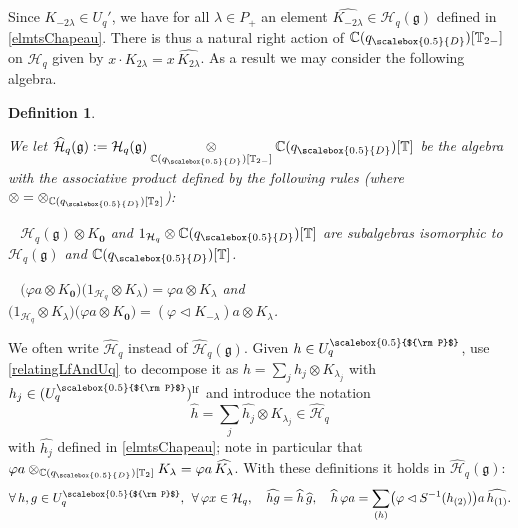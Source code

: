 \documentclass[11pt]{amsart}
\newtheorem{defi}[teo]{Definition}
\newcommand{\qD}{q_{\scalebox{0.5}{D}}}
\newcommand{\Pup}{{\scalebox{0.5}{${\rm P}$}}}
\begin{document}
\indent Since $K_{-2\lambda} \in U_q'$, we have for all $\lambda \in P_+$ an element $\widehat{K_{-2\lambda}} \in \mathcal{H}_q(\mathfrak{g})$ defined in \eqref{elmtsChapeau}. There is thus a natural right action of $\mathbb{C}(\qD)[\mathbb{T}_{2-}]$ on $\mathcal{H}_q$ given by $x \cdot K_{2\lambda} = x\,\widehat{K_{2\lambda}}$. As a result we may consider the following algebra.
\begin{defi}\label{defiHhatq} {\rm We let $\widehat{\mathcal{H}}_q(\mathfrak{g}) := \mathcal{H}_q(\mathfrak{g}) \underset{\mathbb{C}(\qD)[\mathbb{T}_{2-}]}{\otimes} \mathbb{C}(\qD)[\mathbb{T}]$ be the algebra with the associative product defined by the following rules (where $\otimes = \otimes_{\mathbb{C}(\qD)[\mathbb{T}_2]}$):
\smallskip

\indent \textbullet ~ $\mathcal{H}_q(\mathfrak{g}) \otimes K_{\boldsymbol{0}}$ and $1_{\mathcal{H}_q} \otimes \mathbb{C}(\qD)[\mathbb{T}]$ are subalgebras isomorphic to $\mathcal{H}_q(\mathfrak{g})$ and $\mathbb{C}(\qD)[\mathbb{T}]$.

\smallskip

\indent \textbullet ~ $\bigl( \varphi a \otimes K_{\boldsymbol{0}} \bigr) \bigl( 1_{\mathcal{H}_q} \otimes K_\lambda \bigr) = \varphi a \otimes K_\lambda$ and $\bigl( 1_{\mathcal{H}_q} \otimes K_\lambda \bigr) \bigl( \varphi a \otimes K_{\boldsymbol{0}} \bigr) = (\varphi \lhd K_{-\lambda})a \otimes K_\lambda$.}
\end{defi}

\noindent We often write $\widehat{\mathcal{H}}_q$ instead of $\widehat{\mathcal{H}}_q(\mathfrak{g})$. Given $h \in U_q^\Pup$, use \eqref{relatingLfAndUq} to decompose it as $h = \textstyle \sum_j h_j \otimes K_{\lambda_j}$ with $h_j \in(U_q^\Pup)^{\mathrm{lf}}$ and introduce the notation
\begin{equation}\label{elmtsChapeauHq}
\widehat{h} = \textstyle \sum_j  \widehat{h_j} \otimes K_{\lambda_j} \in \widehat{\mathcal{H}}_q
\end{equation}
with $\widehat{h_j}$ defined in \eqref{elmtsChapeau}; note in particular that $\varphi a \otimes_{\mathbb{C}(\qD)[\mathbb{T}_2]} K_\lambda = \varphi a \, \widehat{K_\lambda}$. With these definitions it holds in $\widehat{\mathcal{H}}_q(\mathfrak{g})$:
\begin{equation}\label{commutationHatHq}
\forall \, h,g \in U_q^\Pup, \:\: \forall \, \varphi x \in \mathcal{H}_q, \quad \widehat{hg} = \widehat{h}\,\widehat{g}, \quad \widehat{h} \, \varphi a = \sum_{(h)} \bigl( \varphi \lhd S^{-1}(h_{(2)}) \bigr)a \, \widehat{h_{(1)}}.
\end{equation}
\end{document}
